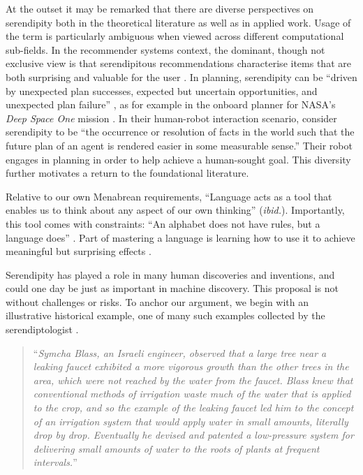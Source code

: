 At the outset it may be remarked that there are diverse perspectives on serendipity both in the theoretical literature as well as in applied work.  Usage of the term is particularly ambiguous when viewed across different computational sub-fields.  In the recommender systems context, the dominant, though not exclusive view is that serendipitous recommendations characterise items that are both surprising and valuable for the user \cite{Lu2012,Herlocker2004}.  In planning, serendipity can be ``driven by unexpected plan successes, expected but uncertain opportunities, and unexpected plan failure'' \cite{NelsonSerendipitySymp17}, as for example in the onboard planner for NASA's \emph{Deep Space One} mission \cite{muscettola1997board}. In their human-robot interaction scenario, \citet{chakraborti2015planning} consider serendipity to be ``the occurrence or resolution of facts in the world such that the future plan of an agent is rendered easier in some measurable sense.''  Their robot engages in planning in order to help achieve a human-sought goal.
This diversity further motivates a return to the foundational literature.

 Relative to our own Menabrean requirements, ``Language acts as a tool that enables us to think about any aspect of our own thinking'' (\emph{ibid.}).  Importantly, this tool comes with constraints: ``An alphabet does not have rules, but a language does'' \cite[p.~ix]{eco2014introduction}.   Part of mastering a language is learning how to use it to achieve meaningful but surprising effects \cite{hoey2012lexical}.

Serendipity has played a role in many human discoveries and inventions, and could one day be just as important in machine discovery.  This proposal is not without challenges or risks.
To anchor our argument, we begin with an illustrative historical example, one of many such examples collected by the serendiptologist \citet{van1994anatomy}.

\begin{quote}
``\emph{Symcha Blass, an Israeli engineer, observed that a large tree near a leaking faucet exhibited a more vigorous growth than the other trees in the area, which were not reached by the water from the faucet.  Blass knew that conventional methods of irrigation waste much of the water that is applied to the crop, and so the example of the leaking faucet led him to the concept of an irrigation system that would apply water in small amounts, literally drop by drop. Eventually he devised and patented a low-pressure system for delivering small amounts of water to the roots of plants at frequent intervals.}'' \cite{shoji1977drip} 
\end{quote}

